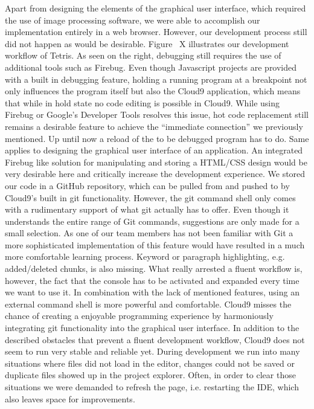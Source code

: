Apart from designing the elements of the graphical user interface, which required the use of image processing software, we were able to accomplish our implementation entirely in a web browser. However, our development process still did not happen as would be desirable. Figure ~\needcite X illustrates our development workflow of Tetris. As seen on the right, debugging still requires the use of additional tools such as Firebug. Even though Javascript projects are provided with a built in debugging feature, holding a running program at a breakpoint not only influences the program itself but also the Cloud9 application, which means that while in hold state no code editing is possible in Cloud9. While using Firebug or Google's Developer Tools resolves this issue, hot code replacement still remains a desirable feature to achieve the ``immediate connection'' we previously mentioned. Up until now a reload of the to be debugged program has to do. Same applies to designing the graphical user interface of an application. An integrated Firebug like solution for manipulating and storing a HTML/CSS design would be very desirable here and critically increase the development experience. We stored our code in a GitHub repository, which can be pulled from and pushed to by Cloud9's built in git functionality. However, the git command shell only comes with a rudimentary support of what git actually has to offer. Even though it understands the entire range of Git commands, suggestions are only made for a small selection. As one of our team members has not been familiar with Git a more sophisticated implementation of this feature would have resulted in a much more comfortable learning process. Keyword or paragraph highlighting, e.g. added/deleted chunks, is also missing. What really arrested a fluent workflow is, however, the fact that the console has to be activated and expanded every time we want to use it. In combination with the lack of mentioned features, using an external command shell is more powerful and comfortable. Cloud9 misses the chance of creating a enjoyable programming experience by harmoniously integrating git functionality into the graphical user interface. In addition to the described obstacles that prevent a fluent development workflow, Cloud9 does not seem to run very stable and reliable yet. During development we run into many situations where files did not load in the editor, changes could not be saved or duplicate files showed up in the project explorer. Often, in order to clear those situations we were demanded to refresh the page, i.e. restarting the IDE, which also leaves space for improvements.

